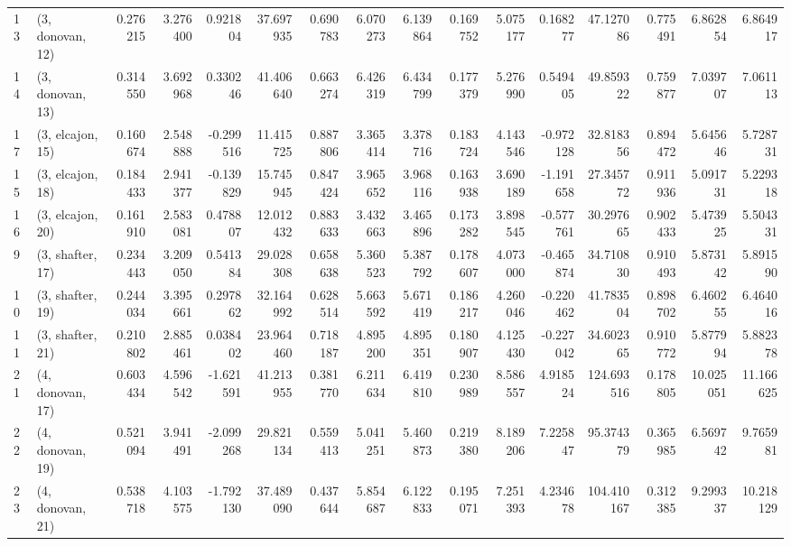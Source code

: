 \begin{tabular}{llrrrrrrrrrrrrrr}
13 &  (3, donovan, 12) &   0.276215 &  3.276400 &  0.921804 &  37.697935 &  0.690783 &   6.070273 &  6.139864 &  0.169752 &  5.075177 &  0.168277 &   47.127086 &  0.775491 &   6.862854 &   6.864917 \\
14 &  (3, donovan, 13) &   0.314550 &  3.692968 &  0.330246 &  41.406640 &  0.663274 &   6.426319 &  6.434799 &  0.177379 &  5.276990 &  0.549405 &   49.859322 &  0.759877 &   7.039707 &   7.061113 \\
17 &  (3, elcajon, 15) &   0.160674 &  2.548888 & -0.299516 &  11.415725 &  0.887806 &   3.365414 &  3.378716 &  0.183724 &  4.143546 & -0.972128 &   32.818356 &  0.894472 &   5.645646 &   5.728731 \\
15 &  (3, elcajon, 18) &   0.184433 &  2.941377 & -0.139829 &  15.745945 &  0.847424 &   3.965652 &  3.968116 &  0.163938 &  3.690189 & -1.191658 &   27.345772 &  0.911936 &   5.091731 &   5.229318 \\
16 &  (3, elcajon, 20) &   0.161910 &  2.583081 &  0.478807 &  12.012432 &  0.883633 &   3.432663 &  3.465896 &  0.173282 &  3.898545 & -0.577761 &   30.297665 &  0.902433 &   5.473925 &   5.504331 \\
9  &  (3, shafter, 17) &   0.234443 &  3.209050 &  0.541384 &  29.028308 &  0.658638 &   5.360523 &  5.387792 &  0.178607 &  4.073000 & -0.465874 &   34.710830 &  0.910493 &   5.873142 &   5.891590 \\
10 &  (3, shafter, 19) &   0.244034 &  3.395661 &  0.297862 &  32.164992 &  0.628514 &   5.663592 &  5.671419 &  0.186217 &  4.260046 & -0.220462 &   41.783504 &  0.898702 &   6.460255 &   6.464016 \\
11 &  (3, shafter, 21) &   0.210802 &  2.885461 &  0.038402 &  23.964460 &  0.718187 &   4.895200 &  4.895351 &  0.180907 &  4.125430 & -0.227042 &   34.602365 &  0.910772 &   5.877994 &   5.882378 \\
21 &  (4, donovan, 17) &   0.603434 &  4.596542 & -1.621591 &  41.213955 &  0.381770 &   6.211634 &  6.419810 &  0.230989 &  8.586557 &  4.918524 &  124.693516 &  0.178805 &  10.025051 &  11.166625 \\
22 &  (4, donovan, 19) &   0.521094 &  3.941491 & -2.099268 &  29.821134 &  0.559413 &   5.041251 &  5.460873 &  0.219380 &  8.189206 &  7.225847 &   95.374379 &  0.365985 &   6.569742 &   9.765981 \\
23 &  (4, donovan, 21) &   0.538718 &  4.103575 & -1.792130 &  37.489090 &  0.437644 &   5.854687 &  6.122833 &  0.195071 &  7.251393 &  4.234678 &  104.410167 &  0.312385 &   9.299337 &  10.218129 \\

\end{tabular}

